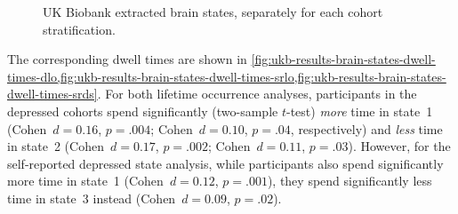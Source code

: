 \begin{figure}[ht]
  \centering
  \caption{
    UK Biobank extracted brain states, separately for each cohort stratification.
  }\label{fig:ukb-results-brain-states}
\end{figure}


The corresponding dwell times are shown in \cref{fig:ukb-results-brain-states-dwell-times-dlo,fig:ukb-results-brain-states-dwell-times-srlo,fig:ukb-results-brain-states-dwell-times-srds}.
For both lifetime occurrence analyses, participants in the depressed cohorts spend significantly (two-sample $t$-test) \emph{more} time in state~1 (Cohen~$d = 0.16$, $p = .004$; Cohen~$d = 0.10$, $p = .04$, respectively) and \emph{less} time in state~2 (Cohen~$d = 0.17$, $p = .002$; Cohen~$d = 0.11$, $p = .03$).
However, for the self-reported depressed state analysis, while participants also spend significantly more time in state~1 (Cohen~$d = 0.12$, $p = .001$), they spend significantly less time in state~3 instead (Cohen~$d = 0.09$, $p = .02$).

